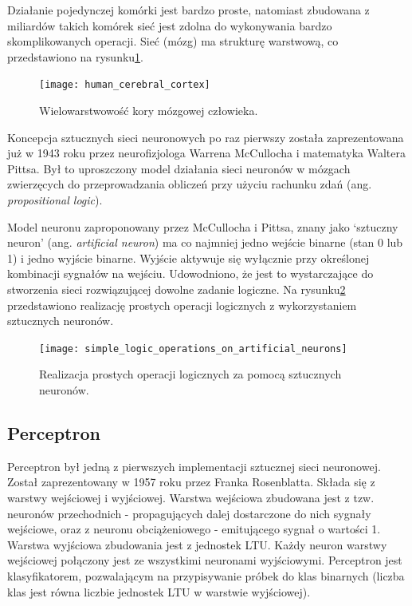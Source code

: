 \documentclass[a4paper,11pt]{article}
\begin{document}
    Działanie pojedynczej komórki jest bardzo proste, natomiast zbudowana z miliardów takich komórek sieć jest zdolna do wykonywania bardzo skomplikowanych operacji. Sieć (mózg) ma strukturę warstwową, co przedstawiono na rysunku\ref{fig:human_cerebral_cortex}\cite{UczenieMaszynowe2018}.

    \bigskip

    \begin{figure}[H]
        \label{fig:human_cerebral_cortex}
        \centering
        \texttt{[image: human\_cerebral\_cortex]}
        \caption{Wielowarstwowość kory mózgowej człowieka\cite{UczenieMaszynowe2018}.}
    \end{figure}

    \bigskip

    Koncepcja sztucznych sieci neuronowych po raz pierwszy została zaprezentowana już w 1943 roku przez neurofizjologa Warrena McCullocha i matematyka Waltera Pittsa\cite{BeginningsOfANN1943}. Był to uproszczony model działania sieci neuronów w mózgach zwierzęcych do przeprowadzania obliczeń przy użyciu rachunku zdań (ang. \textit{propositional logic})\cite{UczenieMaszynowe2018}.

    \bigskip

    Model neuronu zaproponowany przez McCullocha i Pittsa, znany jako `sztuczny neuron' (ang. \textit{artificial neuron}) ma co najmniej jedno wejście binarne (stan 0 lub 1) i jedno wyjście binarne. Wyjście aktywuje się wyłącznie przy określonej kombinacji sygnałów na wejściu. Udowodniono, że jest to wystarczające do stworzenia sieci rozwiązującej dowolne zadanie logiczne\cite{UczenieMaszynowe2018}. Na rysunku\ref{fig:simple_logic_operations_on_artificial_neurons} przedstawiono realizację prostych operacji logicznych z wykorzystaniem sztucznych neuronów.

    \bigskip

    \begin{figure}[H]
        \label{fig:simple_logic_operations_on_artificial_neurons}
        \centering
        \texttt{[image: simple\_logic\_operations\_on\_artificial\_neurons]}
        \caption{Realizacja prostych operacji logicznych za pomocą sztucznych neuronów\cite{UczenieMaszynowe2018}.}
    \end{figure}

    \subsection{Perceptron}

    Perceptron był jedną z pierwszych implementacji sztucznej sieci neuronowej. Został zaprezentowany w 1957 roku przez Franka Rosenblatta. Składa się z warstwy wejściowej i wyjściowej. Warstwa wejściowa zbudowana jest z tzw. neuronów przechodnich - propagujących dalej dostarczone do nich sygnały wejściowe, oraz z neuronu obciążeniowego - emitującego sygnał o wartości 1. Warstwa wyjściowa zbudowania jest z jednostek LTU. Każdy neuron warstwy wejściowej połączony jest ze wszystkimi neuronami wyjściowymi. Perceptron jest klasyfikatorem, pozwalającym na przypisywanie próbek do klas binarnych (liczba klas jest równa liczbie jednostek LTU w warstwie wyjściowej)\cite{UczenieMaszynowe2018}.
\end{document}
